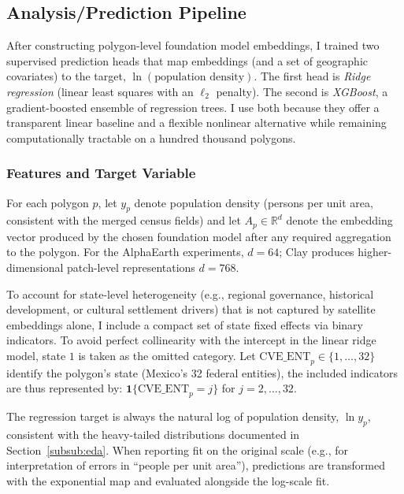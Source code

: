 \documentclass[12pt,letterpaper]{article}
\begin{document}
\subsection{Analysis/Prediction Pipeline}

After constructing polygon-level foundation model embeddings, I trained two supervised prediction heads that map embeddings (and a set of geographic covariates) to the target, $\ln(\text{population density})$. The first head is \emph{Ridge regression} (linear least squares with an $\ell_2$ penalty). The second is \emph{XGBoost}, a gradient-boosted ensemble of regression trees. I use both because they offer a transparent linear baseline and a flexible nonlinear alternative while remaining computationally tractable on a hundred thousand polygons.

\subsubsection{Features and Target Variable}
For each polygon $p$, let $y_p$ denote population density (persons per unit area, consistent with the merged census fields) and let $A_p \in \mathbb{R}^{d}$ denote the embedding vector produced by the chosen foundation model after any required aggregation to the polygon. For the AlphaEarth experiments, $d=64$; Clay produces higher-dimensional patch-level representations $d=768$.

To account for state-level heterogeneity (e.g., regional governance, historical development, or cultural settlement drivers) that is not captured by satellite embeddings alone, I include a compact set of state fixed effects via binary indicators. To avoid perfect collinearity with the intercept in the linear ridge model, state $1$ is taken as the omitted category. Let $\mathrm{CVE\_ENT}_p \in \{1,\ldots,32\}$ identify the polygon's state (Mexico's 32 federal entities), the included indicators are thus represented by: $\textbf{1}\{\mathrm{CVE\_ENT}_p=j\}$ for $j=2,\ldots,32$.

The regression target is always the natural log of population density, $\ln y_p$, consistent with the heavy-tailed distributions documented in Section~\ref{subsub:eda}. When reporting fit on the original scale (e.g., for interpretation of errors in ``people per unit area''), predictions are transformed with the exponential map and evaluated alongside the log-scale fit.
\end{document}
